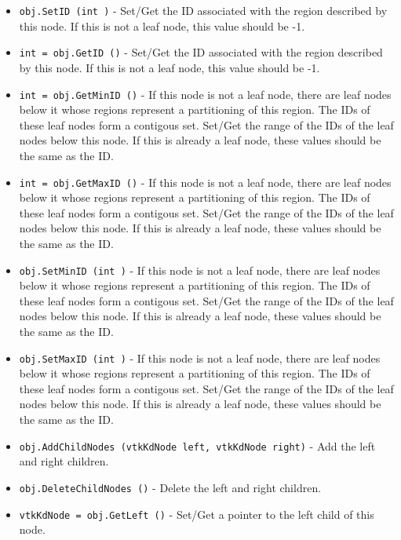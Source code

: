 \begin{itemize}
\item  \verb|obj.SetID (int )| -    Set/Get the ID associated with the region described by this node.  If
   this is not a leaf node, this value should be -1.

\item  \verb|int = obj.GetID ()| -    Set/Get the ID associated with the region described by this node.  If
   this is not a leaf node, this value should be -1.

\item  \verb|int = obj.GetMinID ()| -    If this node is not a leaf node, there are leaf nodes below it whose
   regions represent a partitioning of this region.  The IDs of these
   leaf nodes form a contigous set.  Set/Get the range of the IDs of
   the leaf nodes below this node.  If this is already a leaf node, these
   values should be the same as the ID.

\item  \verb|int = obj.GetMaxID ()| -    If this node is not a leaf node, there are leaf nodes below it whose
   regions represent a partitioning of this region.  The IDs of these
   leaf nodes form a contigous set.  Set/Get the range of the IDs of
   the leaf nodes below this node.  If this is already a leaf node, these
   values should be the same as the ID.

\item  \verb|obj.SetMinID (int )| -    If this node is not a leaf node, there are leaf nodes below it whose
   regions represent a partitioning of this region.  The IDs of these
   leaf nodes form a contigous set.  Set/Get the range of the IDs of
   the leaf nodes below this node.  If this is already a leaf node, these
   values should be the same as the ID.

\item  \verb|obj.SetMaxID (int )| -    If this node is not a leaf node, there are leaf nodes below it whose
   regions represent a partitioning of this region.  The IDs of these
   leaf nodes form a contigous set.  Set/Get the range of the IDs of
   the leaf nodes below this node.  If this is already a leaf node, these
   values should be the same as the ID.

\item  \verb|obj.AddChildNodes (vtkKdNode left, vtkKdNode right)| -    Add the left and right children.

\item  \verb|obj.DeleteChildNodes ()| -    Delete the left and right children.

\item  \verb|vtkKdNode = obj.GetLeft ()| -    Set/Get a pointer to the left child of this node.


\end{itemize}

